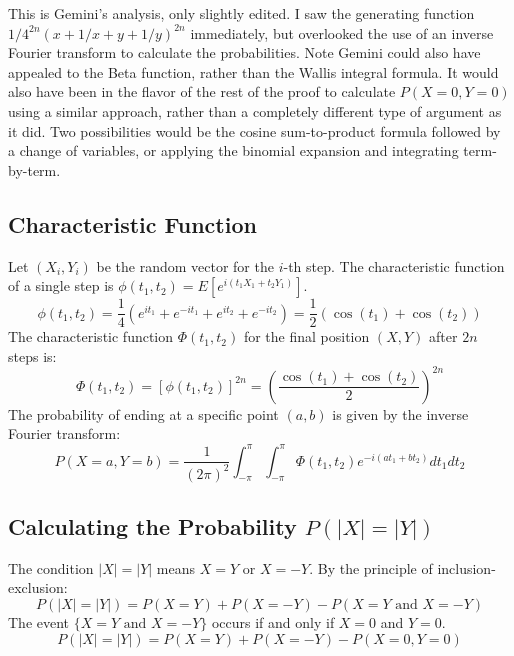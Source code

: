 \documentclass{article}
\begin{document}
This is Gemini's analysis, only slightly edited. I saw the generating function $1/4^{2n} (x+1/x+y+1/y)^{2n}$ immediately, but overlooked the use of an inverse Fourier transform to calculate the probabilities. Note Gemini could also have appealed to the Beta function, rather than the Wallis integral formula. It would also have been in the flavor of the rest of the proof to calculate $P(X=0,Y=0)$ using a similar approach, rather than a completely different type of argument as it did. Two possibilities would be the cosine sum-to-product formula followed by a change of variables, or applying the binomial expansion and integrating term-by-term.

\subsection{Characteristic Function}

Let $(X_i, Y_i)$ be the random vector for the $i$-th step. The characteristic function of a single step is $\phi(t_1, t_2) = E[e^{i(t_1 X_1 + t_2 Y_1)}]$.
\[
\phi(t_1, t_2) = \frac{1}{4} (e^{it_1} + e^{-it_1} + e^{it_2} + e^{-it_2}) = \frac{1}{2} (\cos(t_1) + \cos(t_2))
\]
The characteristic function $\Phi(t_1, t_2)$ for the final position $(X, Y)$ after $2n$ steps is:
\[
\Phi(t_1, t_2) = [\phi(t_1, t_2)]^{2n} = \left( \frac{\cos(t_1) + \cos(t_2)}{2} \right)^{2n}
\]
The probability of ending at a specific point $(a, b)$ is given by the inverse Fourier transform:
\[
P(X=a, Y=b) = \frac{1}{(2\pi)^2} \int_{-\pi}^{\pi} \int_{-\pi}^{\pi} \Phi(t_1, t_2) e^{-i(at_1 + bt_2)} dt_1 dt_2
\]

\subsection{Calculating the Probability $P(|X|=|Y|)$}

The condition $|X|=|Y|$ means $X=Y$ or $X=-Y$. By the principle of inclusion-exclusion:
\[
P(|X|=|Y|) = P(X=Y) + P(X=-Y) - P(X=Y \text{ and } X=-Y)
\]
The event $\{X=Y \text{ and } X=-Y\}$ occurs if and only if $X=0$ and $Y=0$.
\[
P(|X|=|Y|) = P(X=Y) + P(X=-Y) - P(X=0, Y=0)
\]
\end{document}
